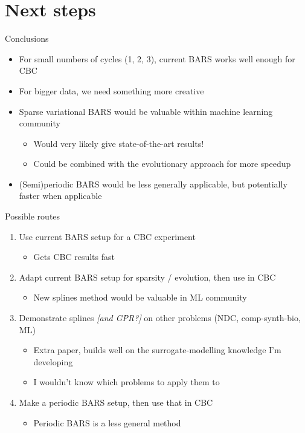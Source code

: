 \documentclass[presentation]{beamer}
\begin{document}
\section{Next steps}
\label{sec:org37f59a6}
\begin{frame}[label={sec:orga9c9ba0}]{Conclusions}
\begin{itemize}[<+->]
\item For small numbers of cycles (1, 2, 3), current BARS works well enough for CBC
\item For bigger data, we need something more creative
\item Sparse variational BARS would be valuable within machine learning community
\begin{itemize}
\item Would very likely give state-of-the-art results!
\item Could be combined with the evolutionary approach for more speedup
\end{itemize}
\item (Semi)periodic BARS would be less generally applicable, but potentially faster when applicable
\end{itemize}
\end{frame}

\begin{frame}[label={sec:orgef933f5}]{Possible routes}
\begin{enumerate}[<+->]
\item Use current BARS setup for a CBC experiment
\begin{itemize}
\item Gets CBC results fast
\end{itemize}
\item Adapt current BARS setup for sparsity / evolution, then use in CBC
\begin{itemize}
\item New splines method would be valuable in ML community
\end{itemize}
\item Demonstrate splines \emph{[and GPR?]} on other problems (NDC, comp-synth-bio, ML)
\begin{itemize}
\item Extra paper, builds well on the surrogate-modelling knowledge I'm developing
\item I wouldn't know which problems to apply them to
\end{itemize}
\item Make a periodic BARS setup, then use that in CBC
\begin{itemize}
\item Periodic BARS is a less general method
\end{itemize}
\end{enumerate}
\end{frame}
\end{document}
